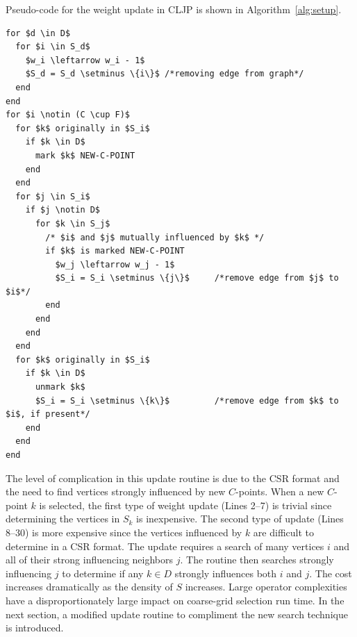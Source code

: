 \documentclass{elsart}
\begin{document}
Pseudo-code for the weight update in CLJP is shown in Algorithm~\ref{alg:setup}.
\begin{lstlisting}[caption={CLJP Weight Update for CSR Matrix},label=alg:setup]
%\textsc{Update-Weights}$(S,\, D,\, C,\, F,\, w)$%
for $d \in D$
  for $i \in S_d$
    $w_i \leftarrow w_i - 1$
    $S_d = S_d \setminus \{i\}$ /*removing edge from graph*/
  end
end
for $i \notin (C \cup F)$
  for $k$ originally in $S_i$
    if $k \in D$
      mark $k$ NEW-C-POINT
    end
  end
  for $j \in S_i$
    if $j \notin D$
      for $k \in S_j$
        /* $i$ and $j$ mutually influenced by $k$ */
        if $k$ is marked NEW-C-POINT      
          $w_j \leftarrow w_j - 1$
          $S_i = S_i \setminus \{j\}$     /*remove edge from $j$ to $i$*/
        end
      end
    end
  end
  for $k$ originally in $S_i$
    if $k \in D$
      unmark $k$
      $S_i = S_i \setminus \{k\}$         /*remove edge from $k$ to $i$, if present*/
    end
  end
end
\end{lstlisting}
The level of complication in this update routine is due to the CSR
format and the need to find vertices strongly influenced by new
$C$-points. When a new $C$-point $k$ is selected, the first type of
weight update (Lines 2--7) is trivial since determining the vertices
in $S_k$ is inexpensive. The second type of update (Lines 8--30) is
more expensive since the vertices influenced by $k$ are difficult to
determine in a CSR format. The update requires a search of many
vertices $i$ and all of their strong influencing neighbors $j$. The
routine then searches strongly influencing $j$ to determine if any $k
\in D$ strongly influences both $i$ and $j$. The cost increases
dramatically as the density of $S$ increases. Large operator
complexities have a disproportionately large impact on coarse-grid
selection run time. In the next section, a modified update routine to
compliment the new search technique is introduced.
\end{document}
